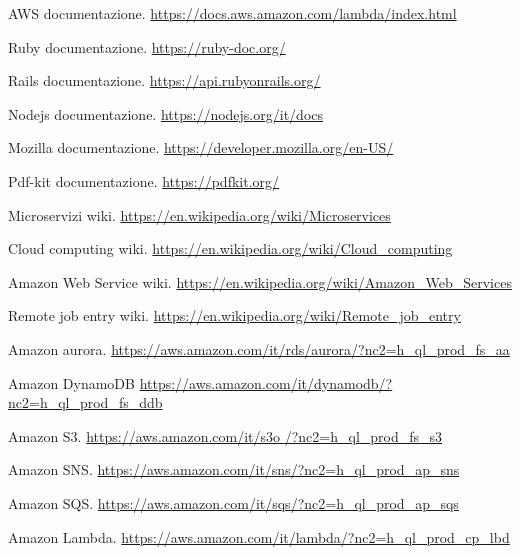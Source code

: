 \documentclass[12pt]{article}
\begin{document}
\begin{thebibliography}{9}
  AWS documentazione. 
  \url{https://docs.aws.amazon.com/lambda/index.html}

  Ruby documentazione.
  \url{https://ruby-doc.org/}

  Rails documentazione.
  \url{https://api.rubyonrails.org/}

  Nodejs documentazione.
  \url{https://nodejs.org/it/docs}

  Mozilla documentazione.
  \url{https://developer.mozilla.org/en-US/}

  Pdf-kit documentazione.
  \url{https://pdfkit.org/}

  Microservizi wiki.
  \url{https://en.wikipedia.org/wiki/Microservices}

  Cloud computing wiki.
  \url{https://en.wikipedia.org/wiki/Cloud_computing}


  Amazon Web Service wiki.
  \url{https://en.wikipedia.org/wiki/Amazon_Web_Services}

  Remote job entry wiki.
  \url{https://en.wikipedia.org/wiki/Remote_job_entry}

  Amazon aurora.
  \url{https://aws.amazon.com/it/rds/aurora/?nc2=h_ql_prod_fs_aa}

  Amazon DynamoDB
  \url{https://aws.amazon.com/it/dynamodb/?nc2=h_ql_prod_fs_ddb}

  Amazon S3.
  \url{https://aws.amazon.com/it/s3o /?nc2=h_ql_prod_fs_s3}


  Amazon SNS.
  \url{https://aws.amazon.com/it/sns/?nc2=h_ql_prod_ap_sns}

  Amazon SQS.
  \url{https://aws.amazon.com/it/sqs/?nc2=h_ql_prod_ap_sqs}

  Amazon Lambda.
  \url{https://aws.amazon.com/it/lambda/?nc2=h_ql_prod_cp_lbd}

\end{thebibliography}
\end{document}
